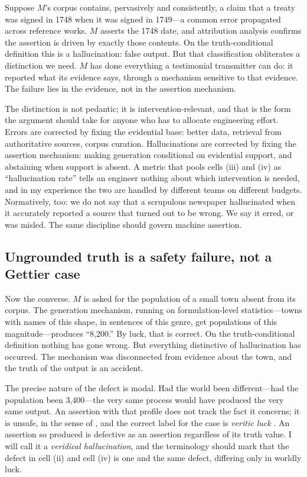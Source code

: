 Suppose $M$'s corpus contains, pervasively and consistently, a claim that a
treaty was signed in 1748 when it was signed in 1749---a common error propagated
across reference works. $M$ asserts the 1748 date, and attribution analysis
confirms the assertion is driven by exactly those contents. On the
truth-conditional definition this is a hallucination: false output. But that
classification obliterates a distinction we need. $M$ has done everything a
testimonial transmitter can do: it reported what its evidence says, through a
mechanism sensitive to that evidence. The failure lies in the evidence, not in
the assertion mechanism.

The distinction is not pedantic; it is intervention-relevant, and that is the
form the argument should take for anyone who has to allocate engineering effort.
Errors are corrected by fixing the evidential base: better data, retrieval from
authoritative sources, corpus curation. Hallucinations are corrected by fixing
the assertion mechanism: making generation conditional on evidential support, and
abstaining when support is absent. A metric that pools cells (iii) and (iv) as
``hallucination rate'' tells an engineer nothing about which intervention is
needed, and in my experience the two are handled by different teams on different
budgets. Normatively, too: we do not say that a scrupulous newspaper
hallucinated when it accurately reported a source that turned out to be wrong.
We say it erred, or was misled. The same discipline should govern machine
assertion.

\subsection{Ungrounded truth is a safety failure, not a Gettier case}
\label{sec:veridical}

Now the converse. $M$ is asked for the population of a small town absent from its
corpus. The generation mechanism, running on formulation-level
statistics---towns with names of this shape, in sentences of this genre, get
populations of this magnitude---produces ``8,200.'' By luck, that is correct. On
the truth-conditional definition nothing has gone wrong. But everything
distinctive of hallucination has occurred. The mechanism was disconnected from
evidence about the town, and the truth of the output is an accident.

The precise nature of the defect is modal. Had the world been
different---had the population been 3,400---the very same process would have
produced the very same output. An assertion with that profile does not track the
fact it concerns; it is unsafe, in the sense of \citet{sosa1999}, and the
correct label for the case is \emph{veritic luck} \citep{pritchard2005}. An
assertion so produced is defective as an assertion regardless of its truth value.
I will call it a \emph{veridical hallucination}, and the terminology should mark
that the defect in cell (ii) and cell (iv) is one and the same defect, differing
only in worldly luck.


